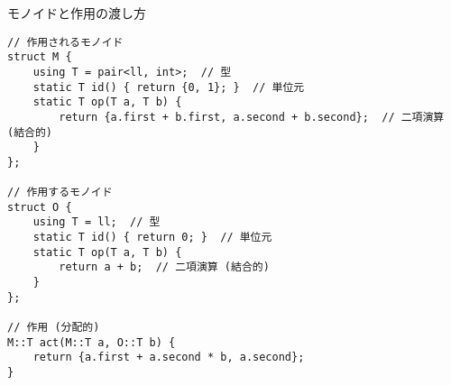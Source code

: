 \begin{small}
モノイドと作用の渡し方
\begin{lstlisting}
// 作用されるモノイド
struct M {
    using T = pair<ll, int>;  // 型
    static T id() { return {0, 1}; }  // 単位元
    static T op(T a, T b) {
        return {a.first + b.first, a.second + b.second};  // 二項演算 (結合的)
    }
};

// 作用するモノイド
struct O {
    using T = ll;  // 型
    static T id() { return 0; }  // 単位元
    static T op(T a, T b) {
        return a + b;  // 二項演算 (結合的)
    }
};

// 作用 (分配的)
M::T act(M::T a, O::T b) {
    return {a.first + a.second * b, a.second};
}

\end{lstlisting}

\end{small}

